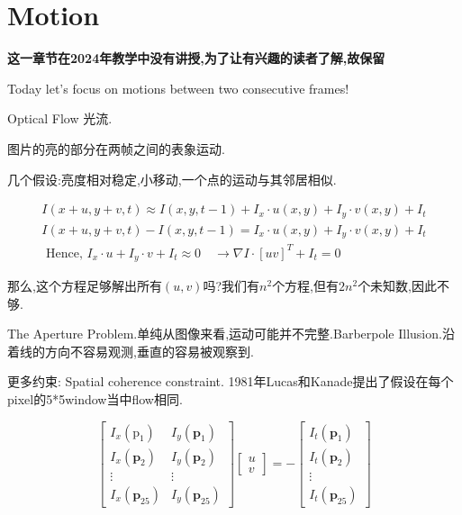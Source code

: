 \section{Motion}

\textbf{这一章节在2024年教学中没有讲授,为了让有兴趣的读者了解,故保留}

	Today let’s focus on motions between two consecutive frames!
	
	Optical Flow 光流.
	
	图片的亮的部分在两帧之间的表象运动.
	
	几个假设:亮度相对稳定,小移动,一个点的运动与其邻居相似.
	
	\begin{equation}
		\begin{array}{l}
			I(x+u, y+v, t) \approx I(x, y, t-1)+I_{x} \cdot u(x, y)+I_{y} \cdot v(x, y)+I_{t} \\
			I(x+u, y+v, t)-I(x, y, t-1)=I_{x} \cdot u(x, y)+I_{y} \cdot v(x, y)+I_{t} \\
			\text { Hence, } I_{x} \cdot u+I_{y} \cdot v+I_{t} \approx 0 \quad \rightarrow \nabla I \cdot[u v]^{T}+I_{t}=0
		\end{array}
	\end{equation}

	那么,这个方程足够解出所有$(u, v)$吗?我们有$n^2$个方程,但有$2n^2$个未知数,因此不够.
	
	The Aperture Problem.单纯从图像来看,运动可能并不完整.Barberpole Illusion.沿着线的方向不容易观测,垂直的容易被观察到.
	
	更多约束: Spatial coherence constraint. 1981年Lucas和Kanade提出了假设在每个pixel的5*5window当中flow相同.
	
	\begin{equation}
		\left[\begin{array}{cc}
			I_{x}\left(\mathrm{p}_{1}\right) & I_{y}\left(\mathbf{p}_{1}\right) \\
			I_{x}\left(\mathbf{p}_{2}\right) & I_{y}\left(\mathbf{p}_{2}\right) \\
			\vdots & \vdots \\
			I_{x}\left(\mathbf{p}_{25}\right) & I_{y}\left(\mathbf{p}_{25}\right)
		\end{array}\right]\left[\begin{array}{l}
			u \\
			v
		\end{array}\right]=-\left[\begin{array}{c}
			I_{t}\left(\mathbf{p}_{1}\right) \\
			I_{t}\left(\mathbf{p}_{2}\right) \\
			\vdots \\
			I_{t}\left(\mathbf{p}_{25}\right)
		\end{array}\right]
	\end{equation}


